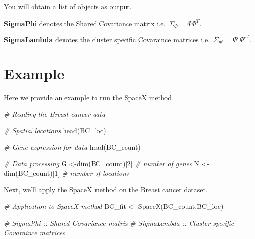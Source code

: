 \documentclass[
]{book}
\newenvironment{Shaded}{\begin{snugshade}}{\end{snugshade}}
\newcommand{\CommentTok}[1]{\textcolor[rgb]{0.56,0.35,0.01}{\textit{#1}}}
\newcommand{\DecValTok}[1]{\textcolor[rgb]{0.00,0.00,0.81}{#1}}
\newcommand{\FunctionTok}[1]{\textcolor[rgb]{0.00,0.00,0.00}{#1}}
\newcommand{\NormalTok}[1]{#1}
\newcommand{\OtherTok}[1]{\textcolor[rgb]{0.56,0.35,0.01}{#1}}
\begin{document}
You will obtain a list of objects as output.

\textbf{SigmaPhi} denotes the Shared Covariance matrix i.e.~\(\Sigma_{\Phi} = \Phi \Phi^{T}\).

\textbf{SigmaLambda} denotes the cluster specific Covaraince matrices i.e.~\(\Sigma_{\Psi^{c}} = \Psi^{c} {\Psi^{c}}^{T}\).

\hypertarget{example}{%
\section{Example}\label{example}}

Here we provide an example to run the SpaceX method.

\begin{Shaded}
\begin{Highlighting}[]
\CommentTok{\# Reading the Breast cancer data}

\CommentTok{\# Spatial locations}
\FunctionTok{head}\NormalTok{(BC\_loc)}

\CommentTok{\# Gene expression for data}
\FunctionTok{head}\NormalTok{(BC\_count) }

\CommentTok{\# Data processing}
\NormalTok{G }\OtherTok{\textless{}{-}}\FunctionTok{dim}\NormalTok{(BC\_count)[}\DecValTok{2}\NormalTok{] }\CommentTok{\# number of genes}
\NormalTok{N }\OtherTok{\textless{}{-}}\FunctionTok{dim}\NormalTok{(BC\_count)[}\DecValTok{1}\NormalTok{] }\CommentTok{\# number of locations}
\end{Highlighting}
\end{Shaded}

Next, we'll apply the SpaceX method on the Breast cancer dataset.

\begin{Shaded}
\begin{Highlighting}[]
\CommentTok{\# Application to SpaceX method}
\NormalTok{BC\_fit }\OtherTok{\textless{}{-}} \FunctionTok{SpaceX}\NormalTok{(BC\_count,BC\_loc)}

\CommentTok{\# SigmaPhi :: Shared Covariance matrix}
\CommentTok{\# SigmaLambda :: Cluster specific Covaraince matrices}
\end{Highlighting}
\end{Shaded}


  
\end{document}
